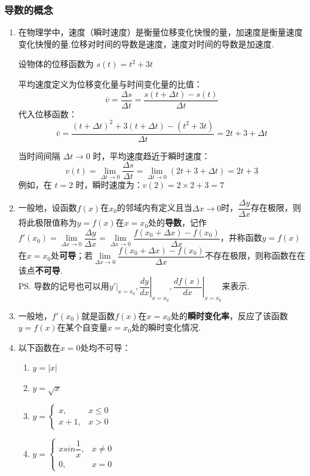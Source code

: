 \subsubsection*{导数的概念}
\begin{enumerate}
    \item 在物理学中，速度（瞬时速度）是衡量位移变化快慢的量，加速度是衡量速度变化快慢的量.位移对时间的导数是速度，速度对时间的导数是加速度.
    \begin{example}
        设物体的位移函数为 $ s(t) = t^2 + 3t $
        
        平均速度定义为位移变化量与时间变化量的比值：
        \[
        \bar{v} = \frac{\Delta s}{\Delta t} = \frac{s(t+\Delta t) - s(t)}{\Delta t}
        \]
        代入位移函数：
        \[
        \bar{v} = \frac{(t+\Delta t)^2 + 3(t+\Delta t) - (t^2 + 3t)}{\Delta t} = 2t + 3 + \Delta t
        \]
        
        当时间间隔 $\Delta t \to 0$ 时，平均速度趋近于瞬时速度：
        \[
        v(t) = \lim_{\Delta t \to 0} \frac{\Delta s}{\Delta t} = \lim_{\Delta t \to 0} (2t + 3 + \Delta t) = 2t + 3
        \]
        例如，在 $ t = 2 $ 时，瞬时速度为：$v(2) = 2 \times 2 + 3 = 7$
    \end{example}
    \item 一般地，设函数$f(x)$在$x_0$的邻域内有定义且当$\Delta x \rightarrow 0$时，$\dfrac{\Delta y}{\Delta x}$存在极限，则将此极限值称为$y = f(x)$在$x = x_0$处的\textbf{导数}，记作$f'(x_0) = \lim\limits_{\Delta x \rightarrow 0}\dfrac{\Delta y}{\Delta x} = \lim\limits_{\Delta x \rightarrow 0}\dfrac{f(x_0+\Delta x) - f(x_0)}{\Delta x}$，并称函数$y = f(x)$在$x = x_0$处\textbf{可导}；若$\lim\limits_{\Delta x \rightarrow 0}\dfrac{f(x_0+\Delta x) - f(x_0)}{\Delta x}$不存在极限，则称函数在在该点\textbf{不可导}. \\
    \ps 导数的记号也可以用$y'|_{x = x_0}, \left.\dfrac{dy}{dx}\right|_{x = x_0}, \left.\dfrac{df(x)}{dx}\right|_{x = x_0}$来表示.
    \item 一般地，$f'(x_0)$就是函数$f(x)$在$x = x_0$处的\textbf{瞬时变化率}，反应了该函数$y = f(x)$在某个自变量$x = x_0$处的瞬时变化情况.
    \item 以下函数在$x = 0$处均不可导：
    \begin{enumerate}
        \item $y = |x|$
        \item $y = \sqrt{x}$
        \item $y = \left\{\begin{array}{ll}
             x, & x \leq 0 \\
             x+1, & x > 0
        \end{array}\right.$
        \item $y = \left\{\begin{array}{ll}
             xsin \dfrac{1}{x}, & x \neq 0 \\
             0, & x = 0
        \end{array}\right.$
    \end{enumerate}
\end{enumerate}
